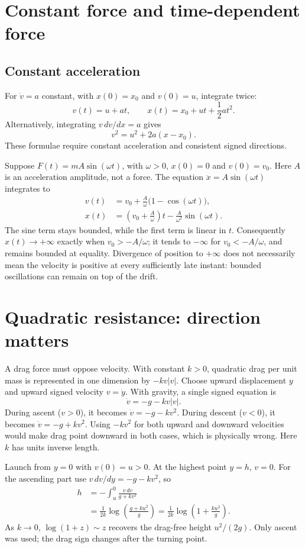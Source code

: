 \section{Constant force and time-dependent force}
\subsection{Constant acceleration}
For $\dot v=a$ constant, with $x(0)=x_0$ and $v(0)=u$, integrate twice:
\[
v(t)=u+at,\qquad x(t)=x_0+ut+\frac12at^2.
\]
Alternatively, integrating $v\,dv/dx=a$ gives
\[
v^2=u^2+2a(x-x_0).
\]
These formulae require constant acceleration and consistent signed directions.

\begin{example}
Suppose $F(t)=mA\sin(\omega t)$, with $\omega>0$, $x(0)=0$ and
$v(0)=v_0$. Here $A$ is an acceleration amplitude, not a force.
The equation $\ddot x=A\sin(\omega t)$ integrates to
\begin{align*}
v(t)&=v_0+\frac A\omega\bigl(1-\cos(\omega t)\bigr),\\
x(t)&=\left(v_0+\frac A\omega\right)t
-\frac A{\omega^2}\sin(\omega t).
\end{align*}
The sine term stays bounded, while the first term is linear in $t$.
Consequently $x(t)\to+\infty$ exactly when $v_0>-A/\omega$;
it tends to $-\infty$ for $v_0<-A/\omega$, and remains bounded at equality.
Divergence of position to $+\infty$ does not necessarily mean the velocity
is positive at every sufficiently late instant: bounded oscillations can
remain on top of the drift.
\end{example}

\section{Quadratic resistance: direction matters}
A drag force must oppose velocity. With constant $k>0$, quadratic drag per
unit mass is represented in one dimension by $-kv|v|$.
Choose upward displacement $y$ and upward signed velocity $v=\dot y$.
With gravity, a single signed equation is
\[
\dot v=-g-kv|v|.
\]
During ascent ($v>0$), it becomes $\dot v=-g-kv^2$.
During descent ($v<0$), it becomes $\dot v=-g+kv^2$.
Using $-kv^2$ for both upward and downward velocities would make drag point
downward in both cases, which is physically wrong.
Here $k$ has units inverse length.

\begin{example}
Launch from $y=0$ with $v(0)=u>0$. At the highest point $y=h$, $v=0$.
For the ascending part use $v\,dv/dy=-g-kv^2$, so
\begin{align*}
h&=-\int_u^0\frac{v\,dv}{g+kv^2}\\
&=\frac1{2k}\log\left(\frac{g+ku^2}{g}\right)
=\frac1{2k}\log\left(1+\frac{ku^2}{g}\right).
\end{align*}
As $k\to0$, $\log(1+z)\sim z$ recovers the drag-free height $u^2/(2g)$.
Only ascent was used; the drag sign changes after the turning point.
\end{example}


